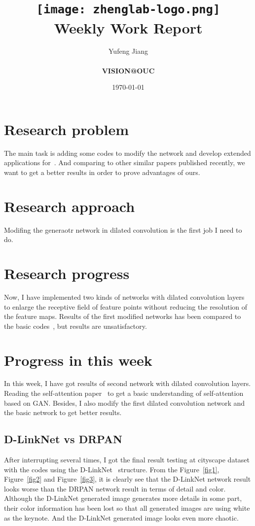 \documentclass[a4paper]{article}
\title{
    \vspace*{1in}
    \texttt{[image: zhenglab-logo.png]}\\
    \vspace*{1.2in}
    \textbf{\huge Weekly Work Report}
    \vspace{0.2in}
}
\author{Yufeng Jiang \\
    \vspace*{0.5in} \\
    \textbf{VISION@OUC} \\
    \vspace*{1in}
}
\date{\today}
\begin{document}
\maketitle
\setcounter{page}{0}
\thispagestyle{empty}
\newpage
\section{Research problem}

The main task is adding some codes to modify the network and develop extended applications for~\cite{dis}. And comparing to other similar papers published recently, we want to get a better results in order to prove advantages of ours.

\section{Research approach}

Modifing the generaotr network in dilated convolution is the first job I need to do.

\section{Research progress}

Now, I have implemented two kinds of networks with dilated convolution layers to enlarge the receptive field of feature points without reducing the resolution of the feature maps. Results of the first modified networks has been compared to the  basic codes~\cite{god}, but results are unsatisfactory.

\section{Progress in this week}

In this week, I have got results of second network with dilated convolution layers. Reading the self-attention paper~\cite{self} to get a basic understanding of self-attention based on GAN. Besides, I also modify the first dilated convolution network and the basic network to get better results.

\subsection{D-LinkNet vs DRPAN}

After interrupting several times, I got the final result testing at cityscape dataset with the codes using the D-LinkNet~\cite{D} structure. From the Figure~\ref{fig1}, Figure~\ref{fig2} and Figure~\ref{fig3}, it is clearly see that the D-LinkNet network result looks worse than the DRPAN network result in terms of detail and color. Although the D-LinkNet generated image generates more details in some part, their color information has been lost so that all generated images are using white as the keynote. And the D-LinkNet generated image looks even more chaotic. 
\end{document}
